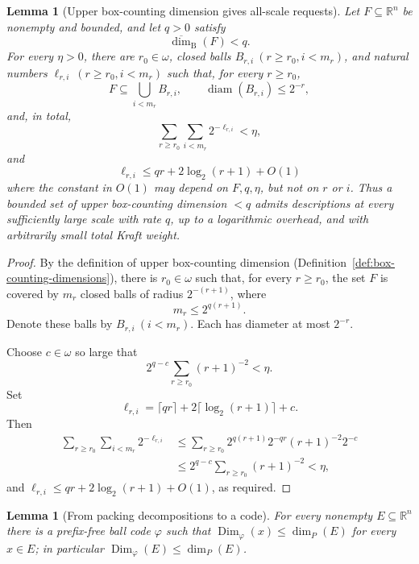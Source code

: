 \documentclass[a4paper,oneside,reqno,12pt]{amsart}
\theoremstyle{plain}
\newtheorem{lemma}[theorem]{Lemma}
\theoremstyle{definition}
\theoremstyle{remark}
\DeclareMathOperator{\Dim}{Dim}
\DeclareMathOperator{\diam}{diam}
\begin{document}
\begin{lemma}[Upper box-counting dimension gives all-scale requests]
\label{lem:upper-box-to-requests}
Let \(F\subseteq\mathbb R^n\) be nonempty and bounded, and let \(q>0\) satisfy
\[
\overline{\dim}_{\mathrm B}(F)<q.
\]
For every \(\eta>0\), there are \(r_0\in\omega\), closed balls
\(B_{r,i}\ (r\ge r_0, i<m_r)\), and natural numbers
\(\ell_{r,i}\ (r\ge r_0, i<m_r)\) such that, for every \(r\ge r_0\),
\[
F\subseteq\bigcup_{i<m_r}B_{r,i},
\qquad
\diam(B_{r,i})\le2^{-r},
\]
and, in total,
\[
\sum_{r\ge r_0}\sum_{i<m_r}2^{-\ell_{r,i}}<\eta,
\]
and
\[
\ell_{r,i}\le qr+2\log_2(r+1)+O(1)
\]
where the constant in \(O(1)\) may depend on \(F,q,\eta\), but not on
\(r\) or \(i\).  Thus a bounded set of upper box-counting dimension \(<q\) admits
descriptions at \emph{every sufficiently large scale} with rate \(q\), up to a
logarithmic overhead, and with arbitrarily small total Kraft weight.
\end{lemma}

\begin{proof}
By the definition of upper box-counting dimension
(Definition~\ref{def:box-counting-dimensions}), there is \(r_0\in\omega\)
such that, for every \(r\ge r_0\), the set \(F\) is covered by
\(m_r\) closed balls of radius \(2^{-(r+1)}\), where
\[
m_r\le2^{q(r+1)}.
\]
Denote these balls by \(B_{r,i}\ (i<m_r)\).  Each has diameter at most
\(2^{-r}\).

Choose \(c\in\omega\) so large that
\[
2^{q-c}\sum_{r\ge r_0}(r+1)^{-2}<\eta.
\]
Set
\[
\ell_{r,i}=\lceil qr\rceil+2\lceil\log_2(r+1)\rceil+c.
\]
Then
\[
\begin{aligned}
\sum_{r\ge r_0}\sum_{i<m_r}2^{-\ell_{r,i}}
&\le
\sum_{r\ge r_0}
2^{q(r+1)}2^{-qr}(r+1)^{-2}2^{-c} \\
&\le
2^{q-c}\sum_{r\ge r_0}(r+1)^{-2}
<\eta,
\end{aligned}
\]
and \(\ell_{r,i}\le qr+2\log_2(r+1)+O(1)\), as required.
\end{proof}


\begin{lemma}[From packing decompositions to a code]
\label{lem:packing-box-to-code}
For every nonempty \(E\subseteq\mathbb R^n\) there is a prefix-free ball code \(\varphi\)
such that \(\Dim_\varphi(x)\le\dim_P(E)\) for every \(x\in E\); in particular
\(\Dim_\varphi(E)\le\dim_P(E)\).
\end{lemma}
\end{document}
